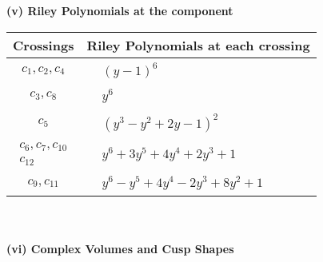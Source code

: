 \documentclass[1p]{elsarticle_modified}
\theoremstyle{definition}
\begin{document}
\newpage\renewcommand{\arraystretch}{1}
\flushleft \textbf{(v) Riley Polynomials at the component}\newline \\
\begin{tabular}{m{50pt}|m{274pt}}
Crossings & \hspace{64pt}Riley Polynomials at each crossing \\
\hline $$\begin{aligned}c_{1},c_{2},c_{4}\end{aligned}$$&$\begin{aligned}
&(y-1)^6
\end{aligned}$\\
\hline $$\begin{aligned}c_{3},c_{8}\end{aligned}$$&$\begin{aligned}
&y^6
\end{aligned}$\\
\hline $$\begin{aligned}c_{5}\end{aligned}$$&$\begin{aligned}
&(y^3- y^2+2 y-1)^2
\end{aligned}$\\
\hline $$\begin{aligned}c_{6},c_{7},c_{10}\\c_{12}\end{aligned}$$&$\begin{aligned}
&y^6+3 y^5+4 y^4+2 y^3+1
\end{aligned}$\\
\hline $$\begin{aligned}c_{9},c_{11}\end{aligned}$$&$\begin{aligned}
&y^6- y^5+4 y^4-2 y^3+8 y^2+1
\end{aligned}$\\
\hline
\end{tabular}\\~\\
\newpage\flushleft \textbf{(vi) Complex Volumes and Cusp Shapes}
\end{document}

